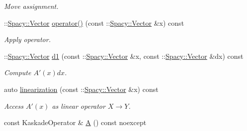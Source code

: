 \begin{DoxyCompactItemize}
\begin{DoxyCompactList}\small\item\em Move assignment. \end{DoxyCompactList}\item 
\+::\hyperlink{classSpacy_1_1Vector}{Spacy\+::\+Vector} \hyperlink{classSpacy_1_1Kaskade_1_1C1Operator_aae23a007cd7a66f90bbb1c93da34735d}{operator()} (const \+::\hyperlink{classSpacy_1_1Vector}{Spacy\+::\+Vector} \&x) const 
\begin{DoxyCompactList}\small\item\em Apply operator. \end{DoxyCompactList}\item 
\+::\hyperlink{classSpacy_1_1Vector}{Spacy\+::\+Vector} \hyperlink{classSpacy_1_1Kaskade_1_1C1Operator_a32cfd05c372cc4bc8d7e0e8aedc1e8b9}{d1} (const \+::\hyperlink{classSpacy_1_1Vector}{Spacy\+::\+Vector} \&x, const \+::\hyperlink{classSpacy_1_1Vector}{Spacy\+::\+Vector} \&dx) const 
\begin{DoxyCompactList}\small\item\em Compute $A'(x)dx$. \end{DoxyCompactList}\item 
auto \hyperlink{classSpacy_1_1Kaskade_1_1C1Operator_afb9837bb1c40e00b53e7430c745b1931}{linearization} (const \+::\hyperlink{classSpacy_1_1Vector}{Spacy\+::\+Vector} \&x) const \hypertarget{classSpacy_1_1Kaskade_1_1C1Operator_afb9837bb1c40e00b53e7430c745b1931}{}\label{classSpacy_1_1Kaskade_1_1C1Operator_afb9837bb1c40e00b53e7430c745b1931}

\begin{DoxyCompactList}\small\item\em Access $A'(x)$ as linear operator $X\rightarrow Y$. \end{DoxyCompactList}\item 
const Kaskade\+Operator \& \hyperlink{classSpacy_1_1Kaskade_1_1C1Operator_ab050915a62f3f8bf25e78af1e1289cb8}{A} () const noexcept\hypertarget{classSpacy_1_1Kaskade_1_1C1Operator_ab050915a62f3f8bf25e78af1e1289cb8}{}\label{classSpacy_1_1Kaskade_1_1C1Operator_ab050915a62f3f8bf25e78af1e1289cb8}


\end{DoxyCompactItemize}
